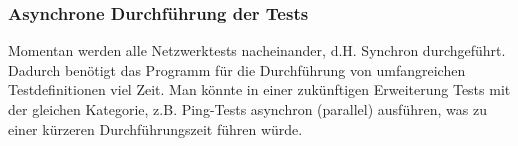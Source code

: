 \documentclass[]{subfiles}
\begin{document}
\subsubsection*{Asynchrone Durchführung der Tests}
Momentan werden alle Netzwerktests nacheinander, d.H. Synchron durchgeführt.
Dadurch benötigt das Programm für die Durchführung von umfangreichen Testdefinitionen 
viel Zeit.
Man könnte in einer zukünftigen Erweiterung Tests mit der gleichen Kategorie, z.B.
Ping-Tests asynchron (parallel) ausführen, was zu einer kürzeren Durchführungszeit 
führen würde. 
\end{document}
